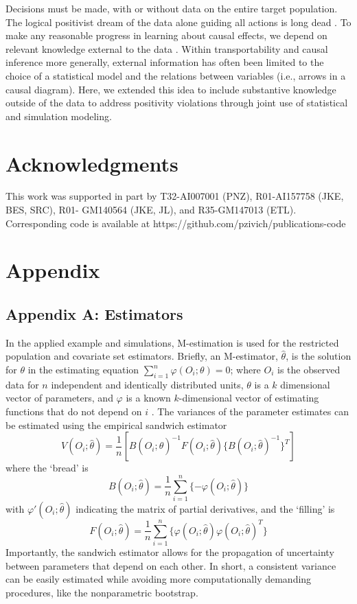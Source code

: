 \documentclass[]{article}
\begin{document}
Decisions must be made, with or without data on the entire target population. The logical positivist dream of the data alone guiding all actions is long dead \cite{quine_main_1951, robins_impossibility_1999, fajardo-fontiveros_fundamental_2022}. To make any reasonable progress in learning about causal effects, we depend on relevant knowledge external to the data \cite{robins_data_2001}. Within transportability and causal inference more generally, external information has often been limited to the choice of a statistical model and the relations between variables (i.e., arrows in a causal diagram). Here, we extended this idea to include substantive knowledge outside of the data to address positivity violations through joint use of statistical and simulation modeling.

\section*{Acknowledgments}

This work was supported in part by T32-AI007001 (PNZ), R01-AI157758 (JKE, BES, SRC), R01- GM140564 (JKE, JL), and R35-GM147013 (ETL).
Corresponding code is available at https://github.com/pzivich/publications-code

\small
{}


\newpage 

\section*{Appendix}

\subsection*{Appendix A: Estimators}

In the applied example and simulations, M-estimation is used for the restricted population and covariate set estimators. Briefly, an M-estimator, $\hat{\theta}$, is the solution for $\theta$ in the estimating equation $\sum_{i=1}^{n} \varphi(O_i;\theta) = 0$; where $O_i$ is the observed data for $n$ independent and identically distributed units, $\theta$ is a $k$ dimensional vector of parameters, and $\varphi$ is a known $k$-dimensional vector of estimating functions that do not depend on $i$ \cite{zivich_delicatessen_2022, stefanski_calculus_2002}. The variances of the parameter estimates can be estimated using the empirical sandwich estimator
\[V(O_i; \hat{\theta}) = \frac{1}{n} \left[B(O_i; \hat{\theta})^{-1} F(O_i; \hat{\theta}) \{B(O_i; \hat{\theta})^{-1}\}^{T}\right]\]
where the `bread' is
\[B(O_i; \hat{\theta}) = \frac{1}{n} \sum_{i=1}^{n} \{- \varphi(O_i; \hat{\theta})\}\]
with $\varphi'(O_i;\hat{\theta})$ indicating the matrix of partial derivatives, and the `filling' is
\[F(O_i; \hat{\theta}) = \frac{1}{n} \sum_{i=1}^{n} \{\varphi(O_i; \hat{\theta}) \varphi(O_i; \hat{\theta})^T\}\]
Importantly, the sandwich estimator allows for the propagation of uncertainty between parameters that depend on each other. In short, a consistent variance can be easily estimated while avoiding more computationally demanding procedures, like the nonparametric bootstrap.
\end{document}
